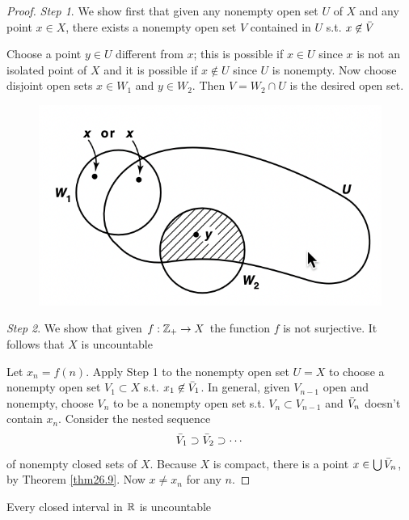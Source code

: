 \documentclass[11pt]{article}
\begin{document}
\begin{proof}
\emph{Step 1}. We show first that given any nonempty open set \(U\) of \(X\) and any point \(x\in X\),
there exists a nonempty open set \(V\) contained in \(U\) s.t. \(x\not\in\bar{V}\)

Choose a point \(y\in U\) different from \(x\); this is possible if \(x\in U\) since \(x\) is not an
isolated point of \(X\) and it is possible if \(x\not\in U\) since \(U\) is nonempty. Now choose
disjoint open sets \(x\in W_1\) and \(y\in W_2\). Then \(V=W_2\cap U\) is the desired open set.

\begin{figure}[htbp]
\centering
\includegraphics[width=.7\textwidth]{../images/Topology/8.png}
\label{}
\end{figure}

\emph{Step 2}. We show that given \(f:\mathbb{Z}_+\to X\) the function \(f\) is not surjective. It follows
that \(X\) is uncountable

Let \(x_n=f(n)\). Apply Step 1 to the nonempty open set \(U=X\) to choose a nonempty open
set \(V_1\subset X\) s.t. \(x_1\not\in\bar{V}_1\). In general, given \(V_{n-1}\) open and nonempty,
choose \(V_n\) to be a nonempty open set s.t. \(V_n\subset V_{n-1}\) and \(\bar{V}_n\) doesn't
contain \(x_n\). Consider the nested sequence
\begin{equation*}
\bar{V}_1\supset \bar{V}_2\supset\cdots
\end{equation*}
of nonempty closed sets of \(X\). Because \(X\) is compact, there is a point \(x\in\bigcup\bar{V}_n\), by
Theorem \ref{thm26.9}. Now \(x\neq x_n\) for any \(n\).
\end{proof}

\begin{corollary}[]
Every closed interval in \(\mathbb{R}\) is uncountable
\end{corollary}
\end{document}
